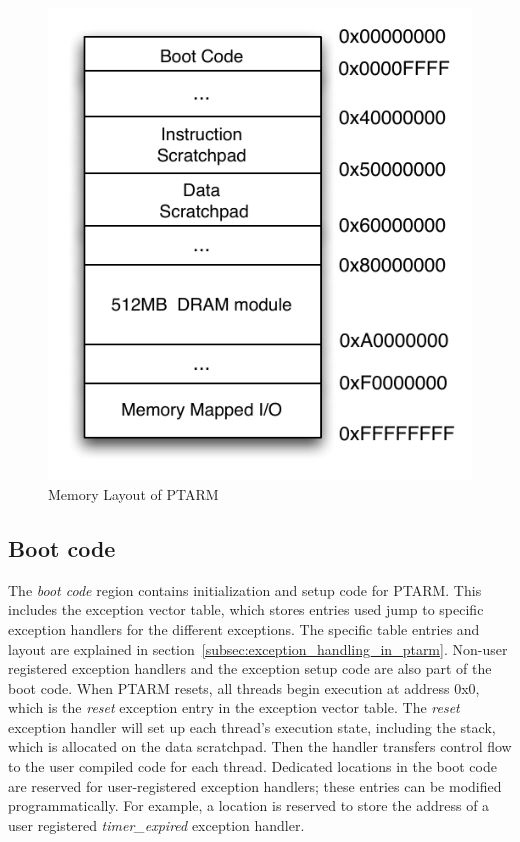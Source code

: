\begin{figure}
  \vspace{-30pt}
  \begin{center}
    \includegraphics[scale=.65]{figs/ptarm_memory_layout}
  \end{center}
  \vspace{-5mm}
  \caption{Memory Layout of PTARM}
  \label{fig:ptarm_memory_layout}
\end{figure} 

\subsection{Boot code}
The \emph{boot code} region contains initialization and setup code for PTARM. 
This includes the exception vector table, which stores entries used jump to specific exception handlers for the different exceptions.
The specific table entries and layout are explained in section~\ref{subsec:exception_handling_in_ptarm}. 
Non-user registered exception handlers and the exception setup code are also part of the boot code.
When PTARM resets, all threads begin execution at address 0x0, which is the \emph{reset} exception entry in the exception vector table.
The \emph{reset} exception handler will set up each thread's execution state, including the stack, which is allocated on the data scratchpad.
Then the handler transfers control flow to the user compiled code for each thread.  
Dedicated locations in the boot code are reserved for user-registered exception handlers; these entries can be modified programmatically. 
For example, a location is reserved to store the address of a user registered \emph{timer\_expired} exception handler.

